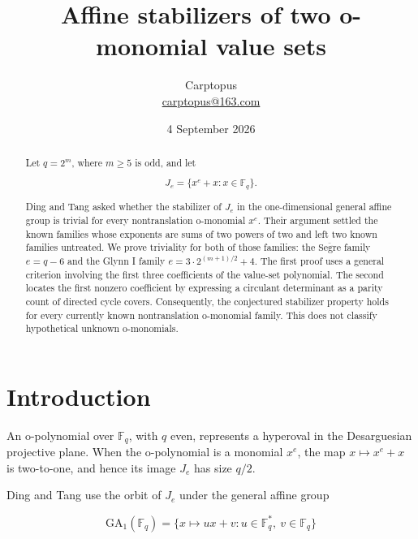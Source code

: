 \documentclass[11pt]{article}
\title{Affine stabilizers of two o-monomial value sets}
\author{Carptopus\\\href{mailto:carptopus@163.com}{carptopus@163.com}}
\date{4 September 2026}
\begin{document}
\maketitle

\begin{center}
\end{center}

\begin{abstract}


Let \(q=2^m\), where \(m\ge 5\) is odd, and let

\[
J_e=\{x^e+x:x\in\mathbb F_q\}.
\]

Ding and Tang asked whether the stabilizer of \(J_e\) in the one-dimensional
general affine group is trivial for every nontranslation o-monomial \(x^e\).
Their argument settled the known families whose exponents are sums of two powers
of two and left two known families untreated. We prove triviality for both of
those families: the \(\overline{\mathrm{Segre}}\) family \(e=q-6\) and the
Glynn I family \(e=3\cdot2^{(m+1)/2}+4\). The first proof uses a general
criterion involving the first three coefficients of the value-set polynomial.
The second locates the first nonzero coefficient by expressing a circulant
determinant as a parity count of directed cycle covers. Consequently, the
conjectured stabilizer property holds for every currently known nontranslation
o-monomial family. This does not classify hypothetical unknown o-monomials.

\end{abstract}

\section{Introduction}


An o-polynomial over \(\mathbb F_q\), with \(q\) even, represents a hyperoval in
the Desarguesian projective plane. When the o-polynomial is a monomial \(x^e\),
the map \(x\mapsto x^e+x\) is two-to-one, and hence its image \(J_e\) has size
\(q/2\).

Ding and Tang \cite{ding-tang} use the orbit of \(J_e\) under the general affine group

\[
\mathrm{GA}_1(\mathbb F_q)
=\{x\mapsto ux+v:u\in\mathbb F_q^*,\ v\in\mathbb F_q\}
\]
\end{document}
